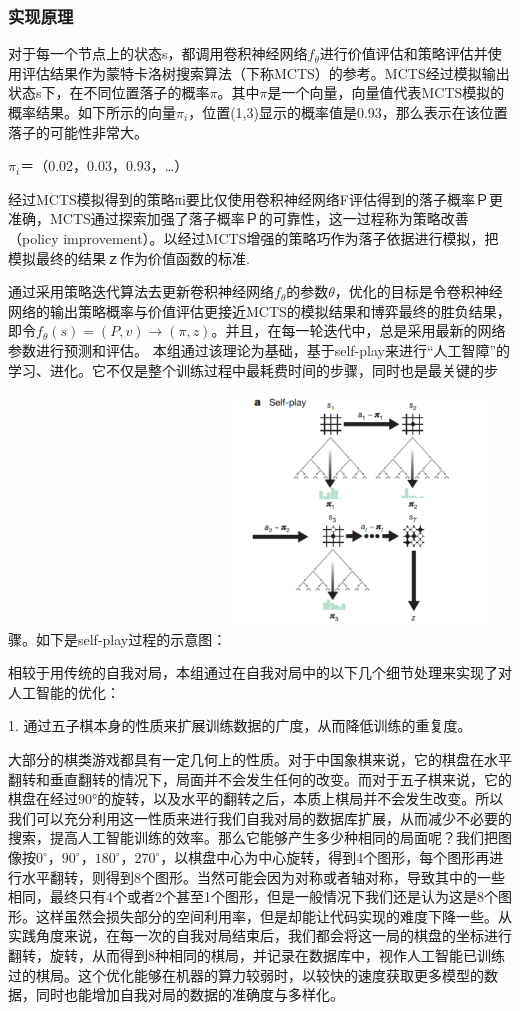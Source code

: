 \documentclass[a4paper]{article}
\begin{document}
\begin{multicols}{2}
\subsubsection{实现原理}
对于每一个节点上的状态s，都调用卷积神经网络$f_\theta$进行价值评估和策略评估并使用评估结果作为蒙特卡洛树搜索算法（下称MCTS）的参考。MCTS经过模拟输出状态s下，在不同位置落子的概率$\pi$。其中$\pi$是一个向量，向量值代表MCTS模拟的概率结果。如下所示的向量$\pi_i$，位置(1,3)显示的概率值是0.93，那么表示在该位置落子的可能性非常大。\par
$\pi_i$＝（0.02，0.03，0.93，…）
\par
经过MCTS模拟得到的策略πi要比仅使用卷积神经网络F评估得到的落子概率Ｐ更准确，MCTS通过探索加强了落子概率Ｐ的可靠性，这一过程称为策略改善（policy improvement）。以经过MCTS增强的策略巧作为落子依据进行模拟，把模拟最终的结果ｚ作为价值函数的标准.\par
通过采用策略迭代算法去更新卷积神经网络$f_\theta$的参数$\theta$，优化的目标是令卷积神经网络的输出策略概率与价值评估更接近MCTS的模拟结果和博弈最终的胜负结果，即令$f_\theta(s)=(P,v)\rightarrow(\pi,z)$。并且，在每一轮迭代中，总是采用最新的网络参数进行预测和评估。\cite{k7}
本组通过该理论为基础，基于self-play来进行“人工智障”的学习、进化。它不仅是整个训练过程中最耗费时间的步骤，同时也是最关键的步骤。如下是self-play过程的示意图：
\includegraphics[width=7cm,height=7cm]{AI1.png}
\par
相较于用传统的自我对局，本组通过在自我对局中的以下几个细节处理来实现了对人工智能的优化：\par
1. 通过五子棋本身的性质来扩展训练数据的广度，从而降低训练的重复度。\par
大部分的棋类游戏都具有一定几何上的性质。对于中国象棋来说，它的棋盘在水平翻转和垂直翻转的情况下，局面并不会发生任何的改变。而对于五子棋来说，它的棋盘在经过90°的旋转，以及水平的翻转之后，本质上棋局并不会发生改变。所以我们可以充分利用这一性质来进行我们自我对局的数据库扩展，从而减少不必要的搜索，提高人工智能训练的效率。那么它能够产生多少种相同的局面呢？我们把图像按$0^{\circ}$，$90^{\circ}$，$180^{\circ}$，$270^{\circ}$，以棋盘中心为中心旋转，得到4个图形，每个图形再进行水平翻转，则得到8个图形。当然可能会因为对称或者轴对称，导致其中的一些相同，最终只有4个或者2个甚至1个图形，但是一般情况下我们还是认为这是8个图形。\cite{k8}这样虽然会损失部分的空间利用率，但是却能让代码实现的难度下降一些。从实践角度来说，在每一次的自我对局结束后，我们都会将这一局的棋盘的坐标进行翻转，旋转，从而得到8种相同的棋局，并记录在数据库中，视作人工智能已训练过的棋局。这个优化能够在机器的算力较弱时，以较快的速度获取更多模型的数据，同时也能增加自我对局的数据的准确度与多样化。\par

\end{multicols}
\end{document}
